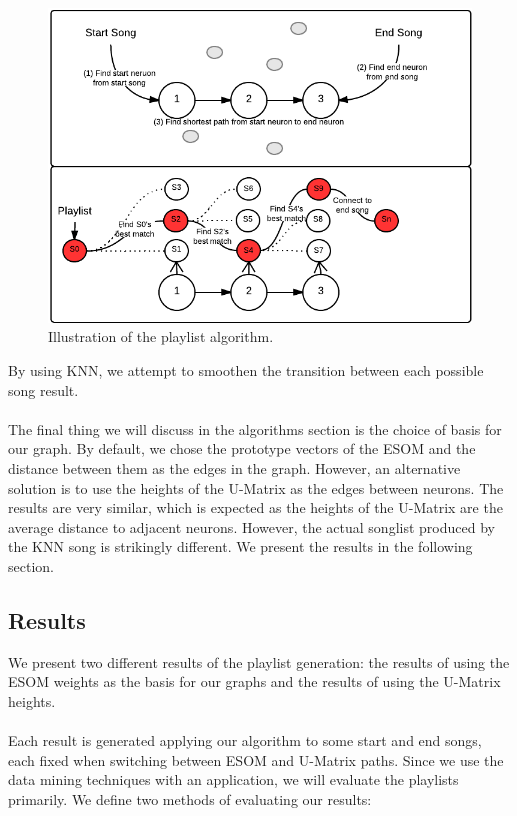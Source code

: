 \begin{figure}[htb!]
	\centering
	\includegraphics[width=\textwidth]{figures/playlist-generation}
	\caption{Illustration of the playlist algorithm.}
\end{figure}
\noindent
By using KNN, we attempt to smoothen the transition between each possible song result. \\\\
The final thing we will discuss in the algorithms section is the choice of basis for our graph. By default, we chose 
the prototype vectors of the ESOM and the distance between them as the edges in the graph. However, an alternative solution is to use the heights of the U-Matrix as the edges between neurons. The results are very similar, which is expected as the heights of the U-Matrix are the average distance to adjacent neurons. However, the actual songlist produced by the KNN song is strikingly different. We present the results in the following section.

\subsection{Results}

We present two different results of the playlist generation: the results of using the ESOM weights as the basis for our graphs and the results of using the U-Matrix heights.\\\\
Each result is generated applying our algorithm to some start and end songs, each fixed when switching between ESOM and U-Matrix paths.
Since we use the data mining techniques with an application, we will evaluate the playlists primarily. We define two methods of evaluating our results:

